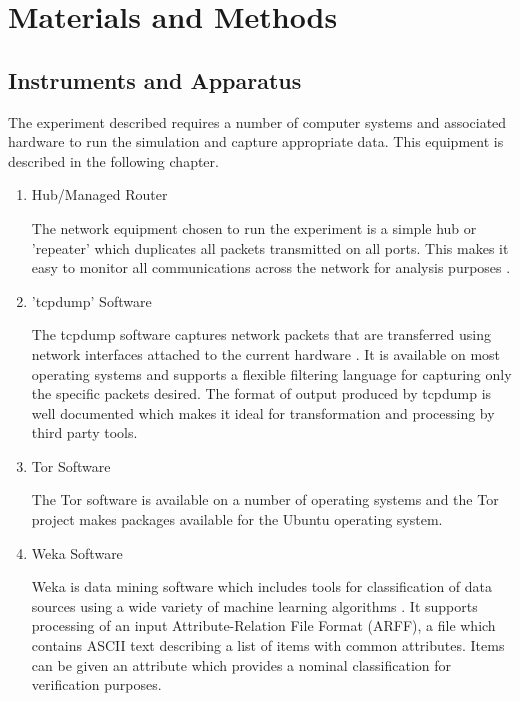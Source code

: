 
\chapter{Materials and Methods}

\section{Instruments and Apparatus}

The experiment described requires a number of computer systems and associated
hardware to run the simulation and capture appropriate data. This equipment is
described in the following chapter.

\begin{enumerate}
  \item Hub/Managed Router

  The network equipment chosen to run the experiment is a simple hub or
  'repeater' which duplicates all packets transmitted on all ports. This makes it
  easy to monitor all communications across the network for analysis purposes
  \parencite{website:hub-reference}.

  \item 'tcpdump' Software

  The tcpdump software captures network packets that are transferred using
  network interfaces attached to the current hardware \parencite{:2009cr}.  It is
  available on most operating systems and supports a flexible filtering language
  for capturing only the specific packets desired. The format of output produced
  by tcpdump is well documented \parencite{:nx} which makes it ideal for
  transformation and processing by third party tools.

  \item Tor Software

  The Tor software is available on a number of operating systems and the Tor
  project makes packages available for the Ubuntu operating system.

  \item Weka Software

  Weka is data mining software which includes tools for classification of data
  sources using a wide variety of machine learning algorithms
  \parencite{Hall:2009p7662}. It supports processing of an input
  Attribute-Relation File Format (ARFF), a file which contains ASCII text
  describing a list of items with common attributes. Items can be given an
  attribute which provides a nominal classification for verification purposes.


\end{enumerate}
